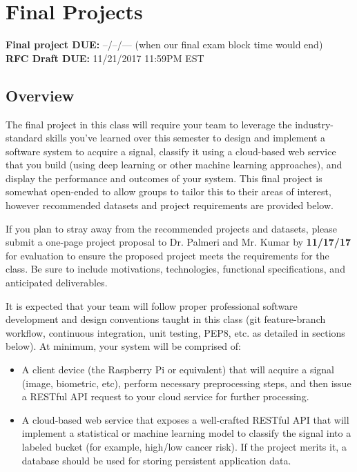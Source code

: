 
\usepackage{hyperref}



\section*{Final Projects}
{\bf Final project DUE:} --/--/--- (when our final exam block time would end) \\
{\bf RFC Draft DUE:} 11/21/2017 11:59PM EST 

\subsection*{Overview}
The final project in this class will require your team to leverage the industry-standard skills you've learned over this semester to design and implement a software system to acquire a signal, classify it using a cloud-based web service that you build (using deep learning or other machine learning approaches), and display the performance and outcomes of your system. This final project is somewhat open-ended to allow groups to tailor this to their areas of interest, however recommended datasets and project requirements are provided below. 

If you plan to stray away from the recommended projects and datasets, please submit a one-page project proposal to Dr. Palmeri and Mr. Kumar by {\bf 11/17/17} for evaluation to ensure the proposed project meets the requirements for the class. Be sure to include motivations, technologies, functional specifications, and anticipated deliverables.

It is expected that your team will follow proper professional software development and design conventions taught in this class (git feature-branch workflow, continuous integration, unit testing, PEP8, etc. as detailed in sections below). At minimum, your system will be comprised of:

\begin{itemize}
	\item A client device (the Raspberry Pi or equivalent) that will acquire a signal (image, biometric, etc), perform necessary preprocessing steps, and then issue a RESTful API request to your cloud service for further processing.
	\item A cloud-based web service that exposes a well-crafted RESTful API that will implement a statistical or machine learning model to classify the signal into a labeled bucket (for example, high/low cancer risk). If the project merits it, a database should be used for storing persistent application data.
\end{itemize}

